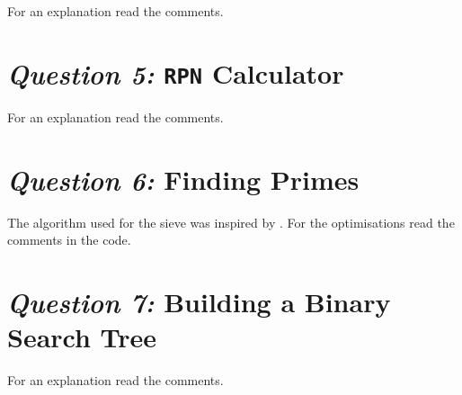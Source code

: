 \documentclass[12pt]{article}
\begin{document}
For an explanation read the comments.







\section{\textit{Question 5:} \texttt{RPN} Calculator}

For an explanation read the comments.







\section{\textit{Question 6:} Finding Primes}

The algorithm used for the sieve was inspired by
\textcite{sorenson90}. For the optimisations read the comments
in the code.







\section{\textit{Question 7:} Building a Binary Search Tree}

For an explanation read the comments.






\end{document}
